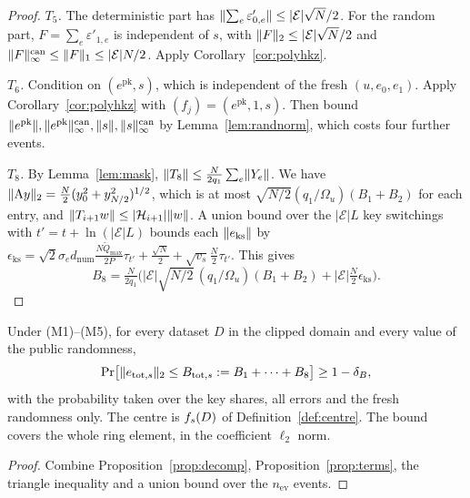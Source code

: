 \begin{proof}
\emph{$T_5$.} The deterministic part has $\lVert \sum_e\varepsilon'_{0,e}\rVert\le|\mathcal E|\sqrt N/2$. For the random part, $F=\sum_e\varepsilon'_{1,e}$ is independent of $s$, with $\lVert F\rVert_2\le|\mathcal E|\sqrt N/2$ and $\lVert F\rVert^{\mathrm{can}}_{\infty}\le\lVert F\rVert_1\le|\mathcal E|N/2$. Apply Corollary~\ref{cor:polyhkz}.

\emph{$T_6$.} Condition on $(e^{\mathrm{pk}},s)$, which is independent of the fresh $(u,e_0,e_1)$. Apply Corollary~\ref{cor:polyhkz} with $(f_j)=(e^{\mathrm{pk}},1,s)$. Then bound $\lVert e^{\mathrm{pk}}\rVert,\lVert e^{\mathrm{pk}}\rVert^{\mathrm{can}}_{\infty},\lVert s\rVert,\lVert s\rVert^{\mathrm{can}}_{\infty}$ by Lemma~\ref{lem:randnorm}, which costs four further events.

\emph{$T_8$.} By Lemma~\ref{lem:mask}, $\lVert T_8\rVert\le\frac N{2q_1}\sum_e\lVert Y_e\rVert$. We have $\lVert \mathrm{A} y\rVert_2=\tfrac N2(y_0^2+y_{N/2}^2)^{1/2}$, which is at most $\sqrt{N/2}(q_1/\Omega_u)(B_1+B_2)$ for each entry, and $\lVert T_{i+1}w\rVert\le|\mathcal{H}_{i+1}|\lVert w\rVert$. A union bound over the $|\mathcal E|L$ key switchings with $t'=t+\ln(|\mathcal E|L)$ bounds each $\lVert e_{\mathrm{ks}}\rVert$ by $\epsilon_{\mathrm{ks}}=\sqrt2\sigma_ed_{\mathrm{num}}\tfrac{N\tilde Q_{\max}}{2P}\tau_{t'}+\tfrac{\sqrt N}2+\sqrt{v_s}\tfrac N2\tau_{t'}$. This gives
\[
  B_8=\tfrac N{2q_1}\bigl(|\mathcal E|\sqrt{N/2}\,(q_1/\Omega_u)(B_1+B_2)+|\mathcal E|\tfrac N2\epsilon_{\mathrm{ks}}\bigr).
\]
\end{proof}

\begin{theorem}\label{thm:O1}
Under (M1)--(M5), for every dataset $D$ in the clipped domain and every value of the public randomness,
\[
  \Pr\bigl[\lVert e_{\mathrm{tot},s}\rVert_2\le B_{\mathrm{tot},s}:=B_1+\dots+B_8\bigr]\ge1-\delta_B ,
\]
with the probability taken over the key shares, all errors and the fresh randomness only. The centre is $f_s(D)$ of Definition~\ref{def:centre}. The bound covers the whole ring element, in the coefficient $\ell_2$ norm.
\end{theorem}
\begin{proof}
Combine Proposition~\ref{prop:decomp}, Proposition~\ref{prop:terms}, the triangle inequality and a union bound over the $n_{\mathrm{ev}}$ events.
\end{proof}

